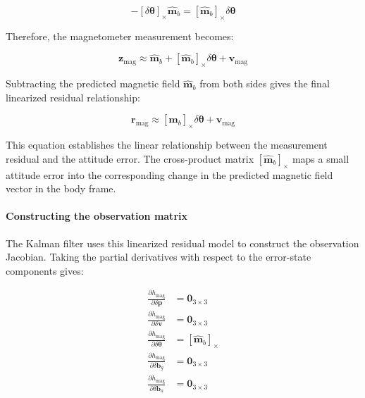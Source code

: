 \documentclass{article}
\begin{document}
	\begin{equation*}
		-[\delta\boldsymbol{\theta}]_\times
		\hat{\mathbf{m}}_b
		=
		[\hat{\mathbf{m}}_b]_\times
		\delta\boldsymbol{\theta}
	\end{equation*}
	
	Therefore, the magnetometer measurement becomes:
	
	\begin{equation}
		\boxed{
			\mathbf{z}_{\text{mag}} \approx
			\hat{\mathbf{m}}_b
			+ [\hat{\mathbf{m}}_b]_\times
			\delta\boldsymbol{\theta}
			+ \mathbf{v}_{\text{mag}}
		}
	\end{equation}
	
	Subtracting the predicted magnetic field $\hat{\mathbf{m}}_b$ from both sides gives the final linearized residual relationship:
	
	\begin{equation}
		\boxed{
			\mathbf{r}_{\text{mag}} \approx
			[\hat{\mathbf{m}}_b]_\times
			\delta\boldsymbol{\theta}
			+ \mathbf{v}_{\text{mag}}
		}
	\end{equation}
	
	This equation establishes the linear relationship between the measurement residual and the attitude error. The cross-product matrix $[\hat{\mathbf{m}}_b]_\times$ maps a small attitude error into the corresponding change in the predicted magnetic field vector in the body frame.
	
	\paragraph{Constructing the observation matrix}
	
	The Kalman filter uses this linearized residual model to construct the observation Jacobian. Taking the partial derivatives with respect to the error-state components gives:
	
	\begin{align*}
		\frac{\partial h_{\text{mag}}}{\partial \delta\mathbf{p}}
		&= \mathbf{0}_{3\times3} \\[4pt]
		\frac{\partial h_{\text{mag}}}{\partial \delta\mathbf{v}}
		&= \mathbf{0}_{3\times3} \\[4pt]
		\frac{\partial h_{\text{mag}}}{\partial \delta\boldsymbol{\theta}}
		&= [\hat{\mathbf{m}}_b]_\times \\[4pt]
		\frac{\partial h_{\text{mag}}}{\partial \delta\mathbf{b}_g}
		&= \mathbf{0}_{3\times3} \\[4pt]
		\frac{\partial h_{\text{mag}}}{\partial \delta\mathbf{b}_a}
		&= \mathbf{0}_{3\times3}
	\end{align*}
	
\end{document}
